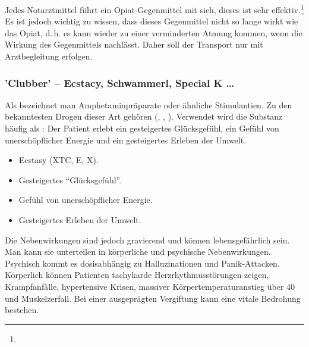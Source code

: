 {
{%
Jedes Notarztmittel führt ein Opiat-Gegenmittel mit sich,
dieses ist sehr effektiv.\footnote{} Es ist
jedoch wichtig zu wissen, dass dieses Gegenmittel nicht so
lange wirkt wie das Opiat, d.\,h. es kann wieder zu einer
verminderten Atmung kommen, wenn die Wirkung des
Gegenmittels nachlässt. Daher soll der Transport nur mit
Arztbegleitung erfolgen.

}{

}{}{}{}


\subsubsection{'Clubber' -- Ecstacy, Schwammerl,
Special K \ldots}

{Als  bezeichnet man Amphetaminpräparate oder
ähnliche Stimulantien. Zu den bekanntesten Drogen dieser Art
gehören   (, , ). Verwendet wird
die Substanz häufig als : Der Patient erlebt
ein gesteigertes Glücksgefühl, ein Gefühl von
unerschöpflicher Energie und ein gesteigertes Erleben der
Umwelt.

\bigskip

\bigskip

\bigskip

}{
\begin{itemize}
  \item Ecstasy (XTC, E, X).
  \item Gesteigertes \enquote{Glücksgefühl}.
  \item Gefühl von unerschöpflicher Energie.
  \item Gesteigertes Erleben der Umwelt.
\end{itemize}
}{}{}{}

{%
Die Nebenwirkungen sind jedoch
gravierend und können lebensgefährlich sein. Man kann sie
unterteilen in körperliche und psychische Nebenwirkungen. 
Psychisch kommt es dosisabhängig zu Halluzinationen
und Panik-Attacken. 
Körperlich können Patienten tachykarde
Herzrhythmusstörungen zeigen, Krampfanfälle, hypertensive
Krisen, massiver Körpertemperaturanstieg über
40\textdegree{} und Muskelzerfall.
Bei einer ausgeprägten Vergiftung kann eine vitale
Bedrohung bestehen. 

\vspace{2cm}

}}

